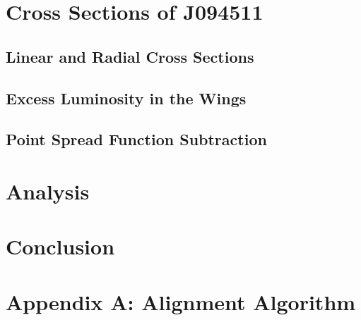 \documentclass[a4paper,11pt]{article}
\begin{document}
\section{Cross Sections of J094511}
\subsection{Linear and Radial Cross Sections}
\subsection{Excess Luminosity in the Wings}
\subsection{Point Spread Function Subtraction}
\section{Analysis}
\section{Conclusion}




\section*{Appendix A: Alignment Algorithm}
\end{document}
